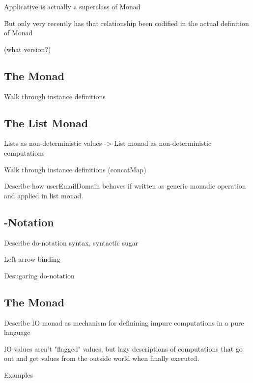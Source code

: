 \begin{notelist}
    \item Applicative is actually a superclass of Monad
    \item But only very recently has that relationship been codified in the actual definition of Monad
    \item (what version?)
\end{notelist}

\subsection{The  Monad}

\begin{notelist}
    \item Walk through instance definitions
\end{notelist}

\subsection{The List Monad}

\begin{notelist}
    \item Lists as non-deterministic values -> List monad as non-deterministic computations
    \item Walk through instance definitions (concatMap)
    \item Describe how userEmailDomain behaves if written as generic monadic operation and applied in list monad.
\end{notelist}

\subsection{-Notation}

\begin{notelist}
    \item Describe do-notation syntax, syntactic sugar
    \item Left-arrow binding
    \item Desugaring do-notation
\end{notelist}

\subsection{The  Monad}

\begin{notelist}
    \item Describe IO monad as mechanism for definining impure computations in a pure language
    \item IO values aren't "flagged" values, but lazy descriptions of computations that go out and get values from
          the outside world when finally executed.
    \item Examples
\end{notelist}


